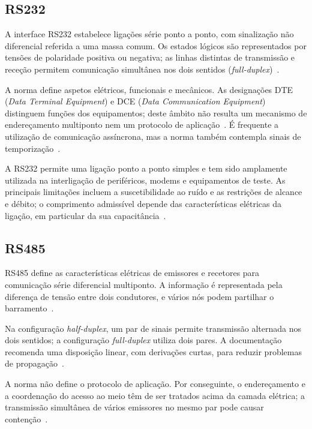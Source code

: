 \subsection{RS232}

A interface RS232 estabelece ligações série ponto a ponto, com sinalização
não diferencial referida a uma massa comum. Os estados lógicos são
representados por tensões de polaridade positiva ou negativa; as linhas
distintas de transmissão e receção permitem comunicação simultânea nos
dois sentidos (\textit{full-duplex})~\cite[secs.~2.1 e~2.2]{dodson_rs232_2023}.

A norma define aspetos elétricos, funcionais e mecânicos. As designações
DTE (\textit{Data Terminal Equipment}) e DCE (\textit{Data Communication
Equipment}) distinguem funções dos equipamentos; deste âmbito não resulta
um mecanismo de endereçamento multiponto nem um protocolo de
aplicação~\cite[sec.~2]{dodson_rs232_2023}.
É frequente a utilização de comunicação assíncrona, mas a norma também
contempla sinais de temporização~\cite{ti_rs232_2002,dodson_rs232_2023}.

A RS232 permite uma ligação ponto a ponto simples e tem sido amplamente
utilizada na interligação de periféricos, modems e equipamentos de teste.
As principais limitações incluem a suscetibilidade ao ruído e as restrições de alcance e débito;
o comprimento admissível depende das características elétricas da
ligação, em particular da sua
capacitância~\cite{ti_rs232_2002,dodson_rs232_2023}.

\subsection{RS485}

RS485 define as características elétricas de emissores e recetores para
comunicação série diferencial multiponto. A informação é representada
pela diferença de tensão entre dois condutores, e vários nós podem
partilhar o barramento~\cite{stiller_rs485_2015,ti_rs485_an1057_2013}.

Na configuração \textit{half-duplex}, um par de sinais permite transmissão
alternada nos dois sentidos; a configuração \textit{full-duplex} utiliza
dois pares. A documentação recomenda uma disposição linear, com
derivações curtas, para reduzir problemas de
propagação~\cite[secs.~2 e~3]{ti_rs485_an1057_2013}.

A norma não define o protocolo de aplicação. Por conseguinte, o
endereçamento e a coordenação do acesso ao meio têm de ser tratados
acima da camada elétrica; a transmissão simultânea de vários emissores
no mesmo par pode causar contenção~\cite[secs.~1 e~10]{ti_rs485_an1057_2013}.

